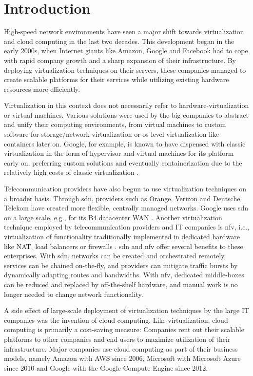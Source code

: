 \chapter{Introduction}
\label{chap:introduction}

High-speed network environments have seen a major shift towards virtualization
and cloud computing in the last two decades. This development began in the early
2000s, when Internet giants like Amazon, Google and Facebook had to cope with
rapid company growth and a sharp expansion of their infrastructure. By deploying
virtualization techniques on their servers, these companies managed to create
scalable platforms for their services while utilizing existing hardware
resources more efficiently.

Virtualization in this context does not necessarily refer to
hardware-virtualization or virtual machines. Various solutions were used by the
big companies to abstract and unify their computing environments, from virtual
machines to custom software for storage/network virtualization or \ac{os}-level
virtualization like containers later on. Google, for example, is known to have
dispensed with classic virtualization in the form of hypervisor and virtual
machines for its platform early on, preferring custom solutions and eventually
containerization due to the relatively high costs of classic virtualization
\cite{verma2015large}.

Telecommunication providers have also begun to use virtualization techniques on
a broader basis. Through \ac{sdn}, providers such as Orange, Verizon and
Deutsche Telekom \cite{csikor2020transition} have created more flexible,
centrally managed networks. Google uses \ac{sdn} on a large scale, e.g., for its
B4 datacenter WAN \cite{jain2013b4}. Another virtualization technique employed
by telecommunication providers and IT companies is \ac{nfv}, i.e.,
virtualization of functionality traditionally implemented in dedicated hardware
like NAT, load balancers or firewalls \cite{roy2018state}. \ac{sdn} and \ac{nfv}
offer several benefits to these enterprises. With \ac{sdn}, networks can be
created and orchestrated remotely, services can be chained on-the-fly, and
providers can mitigate traffic bursts by dynamically adapting routes and
bandwidths. With \ac{nfv}, dedicated middle-boxes can be reduced and replaced by
off-the-shelf hardware, and manual work is no longer needed to change network
functionality.

A side effect of large-scale deployment of virtualization techniques by the
large IT companies was the invention of cloud computing. Like virtualization,
cloud computing is primarily a cost-saving measure: Companies rent out their
scalable platforms to other companies and end users to maximize utilization of
their infrastructure. Major companies use cloud computing as part of their
business models, namely Amazon with AWS since 2006, Microsoft with Microsoft
Azure since 2010 and Google with the Google Compute Engine since 2012.

